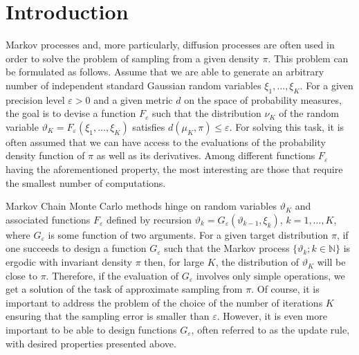 \documentclass[a4paper,bej,preprint,reqno]{imsart}
\begin{document}
\maketitle

\itemsep=0pt
\parskip=3pt
\setcounter{tocdepth}{1}
\tableofcontents

\parskip=10pt

\section{Introduction}

Markov processes and, more particularly, diffusion processes are often used in order to solve the problem of sampling from a given density $\pi$. This problem can be formulated as follows. Assume that we are able to generate an arbitrary number of independent standard Gaussian random variables $\xi_1,\ldots,\xi_K$. For a given precision level $\varepsilon>0$ and a given metric $d$ on the space of probability measures, the goal is to devise a function $F_\varepsilon$ such that the distribution $\nu_K$ of the random variable $\vartheta_K = F_\varepsilon(\xi_1,\ldots,\xi_K)$ satisfies $d(\mu_K,\pi)\le \varepsilon$. For solving this task, it is often assumed that we can have access to the evaluations of the probability density function of $\pi$ as well as its derivatives. Among different functions $F_\varepsilon$ having the aforementioned
property, the most interesting are those that require the smallest number of computations.

Markov Chain Monte Carlo methods hinge on random variables $\vartheta_K$ and associated functions $F_\varepsilon$ defined by recursion $\vartheta_{k} = G_\varepsilon(\vartheta_{k-1},\xi_k)$, $k=1,\ldots,K$, where $G_\varepsilon$ is some function of two arguments. For a given target distribution $\pi$, if one succeeds to design a function $G_\varepsilon$ such that the Markov process $\{\vartheta_k;k\in\mathbb N\}$ is ergodic with invariant density $\pi$ then, for large $K$, the distribution of $\vartheta_K$ will be close to $\pi$. Therefore, if the evaluation of $G_\varepsilon$ involves only simple operations, we get a solution of the task of approximate sampling from $\pi$. Of course, it is important to address the problem of the choice of the number of iterations $K$ ensuring that the sampling error is smaller than $\varepsilon$. However, it is even more important to be able to design functions $G_\varepsilon$, often referred to as the update rule,
with desired properties presented above.
\end{document}
